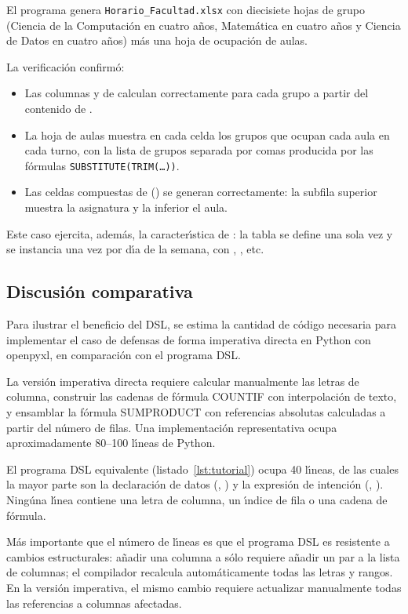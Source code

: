 El programa  genera \texttt{Horario\_Facultad.xlsx}
con diecisiete hojas de grupo (Ciencia de la Computaci\'on en cuatro a\~nos,
Matem\'atica en cuatro a\~nos y Ciencia de Datos en cuatro a\~nos) m\'as una
hoja de ocupaci\'on de aulas.

La verificaci\'on confirm\'o:

\begin{itemize}
  \item Las columnas  y  de 
    calculan correctamente para cada grupo a partir del contenido de
    .
  \item La hoja de aulas muestra en cada celda los grupos que ocupan cada
    aula en cada turno, con la lista de grupos separada por comas producida
    por las f\'ormulas \texttt{SUBSTITUTE(TRIM(\ldots))}.
  \item Las celdas compuestas de  ()
    se generan correctamente: la subfila superior muestra la asignatura y
    la inferior el aula.
\end{itemize}

Este caso ejercita, adem\'as, la caracter\'{\i}stica de :
la tabla  se define una sola vez y se instancia una
vez por d\'{\i}a de la semana, con , , etc.

\subsection{Discusi\'on comparativa}
\label{ssec:val-comparacion}

Para ilustrar el beneficio del DSL, se estima la cantidad de c\'odigo
necesaria para implementar el caso de defensas de forma imperativa directa
en Python con openpyxl, en comparaci\'on con el programa DSL.

La versi\'on imperativa directa requiere calcular manualmente las letras de
columna, construir las cadenas de f\'ormula COUNTIF con interpolaci\'on de
texto, y ensamblar la f\'ormula SUMPRODUCT con referencias absolutas calculadas
a partir del n\'umero de filas.  Una implementaci\'on representativa ocupa
aproximadamente 80--100 l\'{\i}neas de Python.

El programa DSL equivalente (listado~\ref{lst:tutorial}) ocupa 40 l\'{\i}neas,
de las cuales la mayor parte son la declaraci\'on de datos
(, ) y la expresi\'on de intenci\'on
(, ).  Ning\'una l\'{\i}nea
contiene una letra de columna, un \'{\i}ndice de fila o una cadena de f\'ormula.

M\'as importante que el n\'umero de l\'{\i}neas es que el programa DSL es
resistente a cambios estructurales: a\~nadir una columna a 
s\'olo requiere a\~nadir un par  a la lista de columnas;
el compilador recalcula autom\'aticamente todas las letras y rangos.  En la
versi\'on imperativa, el mismo cambio requiere actualizar manualmente todas
las referencias a columnas afectadas.
